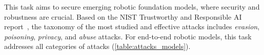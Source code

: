 This task aims to secure emerging robotic foundation models, where security and robustness are crucial.
Based on the NIST Trustworthy and Responsible AI report~\cite{NIST_AI_100_2e2023}, the taxonomy of the most studied and effective attacks includes \emph{evasion}, \emph{poisoning}, \emph{privacy}, and \emph{abuse} attacks. %
For end-to-end robotic models, this task addresses all categories of attacks (\autoref{table:attacks_models}).%
\\
